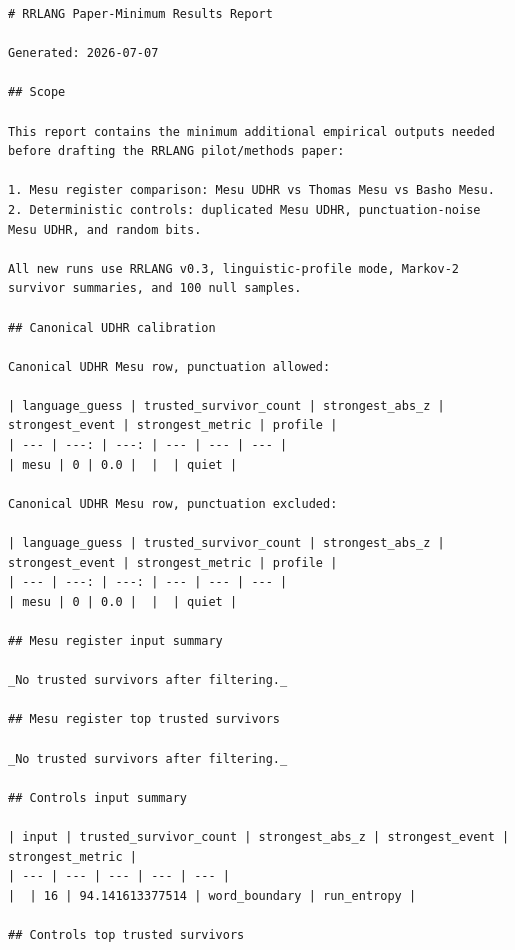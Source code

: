 \documentclass[11pt,a4paper]{article}
\begin{document}
\begin{lstlisting}
# RRLANG Paper-Minimum Results Report

Generated: 2026-07-07

## Scope

This report contains the minimum additional empirical outputs needed before drafting the RRLANG pilot/methods paper:

1. Mesu register comparison: Mesu UDHR vs Thomas Mesu vs Basho Mesu.
2. Deterministic controls: duplicated Mesu UDHR, punctuation-noise Mesu UDHR, and random bits.

All new runs use RRLANG v0.3, linguistic-profile mode, Markov-2 survivor summaries, and 100 null samples.

## Canonical UDHR calibration

Canonical UDHR Mesu row, punctuation allowed:

| language_guess | trusted_survivor_count | strongest_abs_z | strongest_event | strongest_metric | profile |
| --- | ---: | ---: | --- | --- | --- |
| mesu | 0 | 0.0 |  |  | quiet |

Canonical UDHR Mesu row, punctuation excluded:

| language_guess | trusted_survivor_count | strongest_abs_z | strongest_event | strongest_metric | profile |
| --- | ---: | ---: | --- | --- | --- |
| mesu | 0 | 0.0 |  |  | quiet |

## Mesu register input summary

_No trusted survivors after filtering._

## Mesu register top trusted survivors

_No trusted survivors after filtering._

## Controls input summary

| input | trusted_survivor_count | strongest_abs_z | strongest_event | strongest_metric |
| --- | --- | --- | --- | --- |
|  | 16 | 94.141613377514 | word_boundary | run_entropy |

## Controls top trusted survivors


\end{lstlisting}
\end{document}
